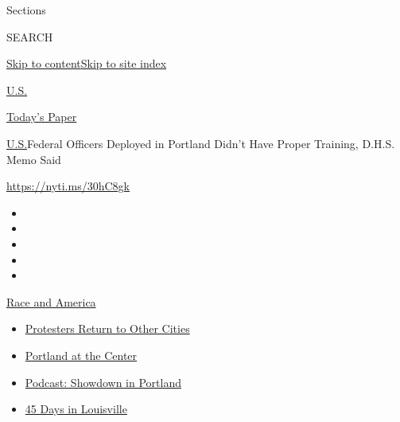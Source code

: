 Sections

SEARCH

\protect\hyperlink{site-content}{Skip to
content}\protect\hyperlink{site-index}{Skip to site index}

\href{https://www.nytimes3xbfgragh.onion/section/us}{U.S.}

\href{https://myaccount.nytimes3xbfgragh.onion/auth/login?response_type=cookie\&client_id=vi}{}

\href{https://www.nytimes3xbfgragh.onion/section/todayspaper}{Today's
Paper}

\href{/section/us}{U.S.}\textbar{}Federal Officers Deployed in Portland
Didn't Have Proper Training, D.H.S. Memo Said

\url{https://nyti.ms/30hC8gk}

\begin{itemize}
\item
\item
\item
\item
\item
\end{itemize}

\href{https://www.nytimes3xbfgragh.onion/news-event/george-floyd-protests-minneapolis-new-york-los-angeles?action=click\&pgtype=Article\&state=default\&region=TOP_BANNER\&context=storylines_menu}{Race
and America}

\begin{itemize}
\tightlist
\item
  \href{https://www.nytimes3xbfgragh.onion/2020/07/26/us/protests-portland-seattle-trump.html?action=click\&pgtype=Article\&state=default\&region=TOP_BANNER\&context=storylines_menu}{Protesters
  Return to Other Cities}
\item
  \href{https://www.nytimes3xbfgragh.onion/2020/07/24/us/portland-oregon-protests-white-race.html?action=click\&pgtype=Article\&state=default\&region=TOP_BANNER\&context=storylines_menu}{Portland
  at the Center}
\item
  \href{https://www.nytimes3xbfgragh.onion/2020/07/23/podcasts/the-daily/portland-protests.html?action=click\&pgtype=Article\&state=default\&region=TOP_BANNER\&context=storylines_menu}{Podcast:
  Showdown in Portland}
\item
  \href{https://www.nytimes3xbfgragh.onion/interactive/2020/07/16/us/black-lives-matter-protests-louisville-breonna-taylor.html?action=click\&pgtype=Article\&state=default\&region=TOP_BANNER\&context=storylines_menu}{45
  Days in Louisville}
\end{itemize}

